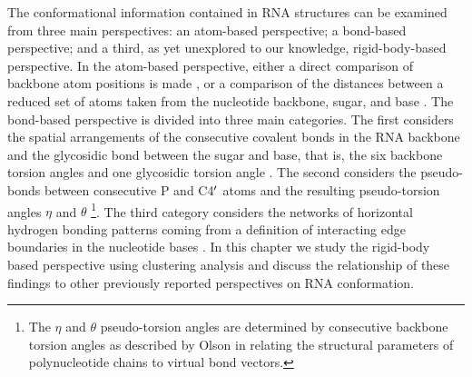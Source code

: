 \noindent The  conformational information contained  in RNA structures
can  be   examined  from   three  main  perspectives:   an  atom-based
perspective; a bond-based perspective;  and a third, as yet unexplored
to  our knowledge,  rigid-body-based perspective.   In  the atom-based
perspective, either a direct  comparison of backbone atom positions is
made \cite{reijmers2001},  or a comparison of the  distances between a
reduced set  of atoms taken  from the nucleotide backbone,  sugar, and
base  \cite{sykes2005}.  The  bond-based perspective  is  divided into
three main  categories.  The first considers  the spatial arrangements
of  the  consecutive  covalent  bonds  in the  RNA  backbone  and  the
glycosidic bond between the sugar  and base, that is, the six backbone
torsion  angles and one  glycosidic torsion  angle \cite{reijmers2001,
  murray2003,  hershkovitz2003, schneider2004,  hershkovitz2006}.  The
second   considers  the   pseudo-bonds  between   consecutive   P  and
C4$^{\rm{\prime}}$  atoms  and  the  resulting  pseudo-torsion  angles
$\eta$   and  $\theta$   \cite{olson1_1972,   duarte1998,  duarte2003,
  wadley2007} \footnote{The $\eta$  and $\theta$ pseudo-torsion angles
  are determined  by consecutive backbone torsion  angles as described
  by Olson  \cite{olson1980} in relating the  structural parameters of
  polynucleotide chains to virtual bond vectors.}.  The third category
considers the networks of  horizontal hydrogen bonding patterns coming
from  a definition of  interacting edge  boundaries in  the nucleotide
bases \cite{westhof2000,  leontis2002, leontis2006}.  In  this chapter
we study  the rigid-body  based perspective using  clustering analysis
and  discuss the relationship  of these  findings to  other previously
reported perspectives on RNA conformation.

